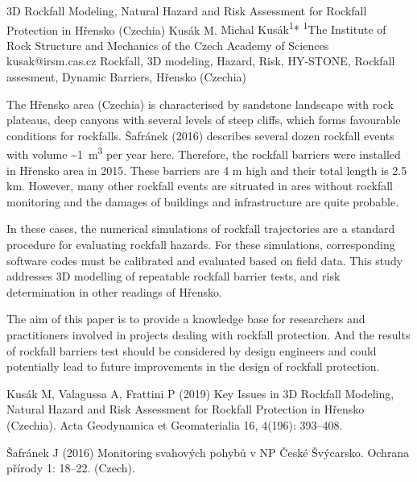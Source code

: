 \abstract
{3D Rockfall Modeling, Natural Hazard and Risk Assessment for Rockfall Protection in Hřensko (Czechia)} 
{Kusák M.} 
{Michal Kusák\textsuperscript{1}*} 
{\POtag} 
{
	\textsuperscript{1}The Institute of Rock Structure and Mechanics of the Czech Academy of Sciences
}
{kusak@irsm.cas.cz}  %
{Rockfall, 3D modeling, Hazard, Risk, HY-STONE, Rockfall assesment, Dynamic Barriers, Hřensko (Czechia)}
{The Hřensko area (Czechia) is characterised by sandstone landscape with rock plateaus, deep canyons with several levels of steep cliffs, which forms favourable conditions for rockfalls. Šafránek (2016) describes several dozen rockfall events with volume \textasciitilde1~m\textsuperscript{3} per year here. Therefore, the rockfall barriers were installed in Hřensko area in 2015. These barriers are 4 m high and their total length is 2.5 km. However, many other rockfall events are sitruated in ares without rockfall monitoring and the damages of buildings and infrastructure are quite probable. 

In these cases, the numerical simulations of rockfall trajectories are a standard procedure for evaluating rockfall hazards. For these simulations, corresponding software codes must be calibrated and evaluated based on field data. This study addresses 3D modelling of repeatable rockfall barrier tests, and risk determination in other readings of Hřensko.

The aim of this paper is to provide a knowledge base for researchers and practitioners involved in projects dealing with rockfall protection. And the results of rockfall barriers test should be considered by design engineers and could potentially lead to future improvements in the design of rockfall protection.
}
{Kusák M, Valagussa A, Frattini P (2019) Key Issues in 3D Rockfall Modeling, Natural Hazard and Risk Assessment for Rockfall Protection in Hřensko (Czechia). Acta Geodynamica et Geomaterialia 16, 4(196): 393–408.

Šafránek J (2016) Monitoring svahových pohybů v NP České Švýcarsko. Ochrana přírody 1: 18–22. (Czech).
}

